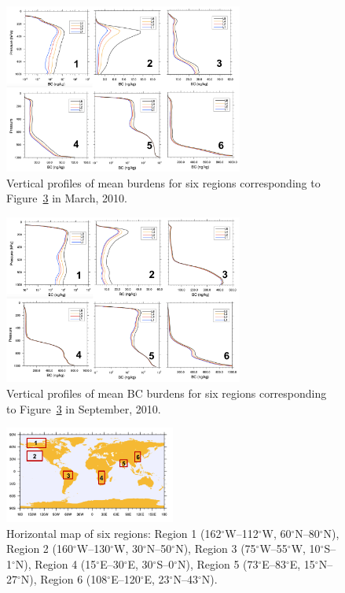 \documentclass[12pt]{article}
\begin{document}
	\begin{figure}[H] 
		\begin{center}
			\includegraphics[width = 0.7\textwidth]{Figure14}
			\caption[]{\label{fig_P14} Vertical profiles of mean  burdens for six regions corresponding to Figure~\ref{fig_P15} in March, 2010.}
		\end{center}
	\end{figure}
	
	
	\begin{figure}[H] 
		\begin{center}
			\includegraphics[width = 0.7\textwidth]{Figure16}
			\caption[]{\label{fig_P16} Vertical profiles of mean BC burdens for six regions corresponding to Figure~\ref{fig_P15} in September, 2010.}
		\end{center}
	\end{figure}
	
	\begin{figure}[H] 
		\begin{center}
			\includegraphics[width = 0.5\textwidth]{Figure15}
			\caption[]{\label{fig_P15} Horizontal map of six regions: Region 1 (162$^\circ$W--112$^\circ$W, 60$^\circ$N--80$^\circ$N), Region 2 (160$^\circ$W--130$^\circ$W, 30$^\circ$N--50$^\circ$N), Region 3 (75$^\circ$W--55$^\circ$W, 10$^\circ$S--1$^\circ$N), Region 4 (15$^\circ$E--30$^\circ$E, 30$^\circ$S--0$^\circ$N), Region 5 (73$^\circ$E--83$^\circ$E, 15$^\circ$N--27$^\circ$N), Region 6 (108$^\circ$E--120$^\circ$E, 23$^\circ$N--43$^\circ$N).}
		\end{center}
	\end{figure}
	
\end{document}
